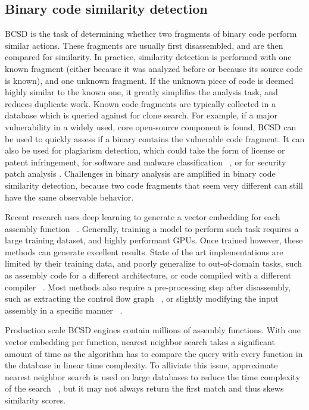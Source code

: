 \subsection{Binary code similarity detection}

BCSD is the task of determining whether two fragments of binary code perform similar actions.
These fragments are usually first disassembled, and are then compared for similarity. In practice,
similarity detection is performed with one known fragment (either because it was analyzed before
or because its source code is known), and one unknown fragment. If the unknown piece of code is deemed
highly similar to the known one, it greatly simplifies the analysis task, and reduces duplicate work. Known
code fragments are typically collected in a database which is queried against for clone search. For example,
if a major vulnerability in a widely used, core open-source component is found, BCSD can be used to quickly
assess if a binary contains the vulnerable code fragment. It can also be used for plagiarism detection, which
could take the form of license or patent infringement, for software and malware classification ~\cite{op-seq}, or for 
security patch analysis \cite{patch}. Challenges in binary analysis are amplified in binary code similarity detection,
because two code fragments that seem very different can still have the same observable behavior.

Recent research uses deep learning to generate a vector embedding for each assembly function ~\cite{SAFE,PalmTree,OrderMatters,Asm2Vec,CLAP}.
Generally, training a model to perform such task requires a large training dataset, and highly performant GPUs.
Once trained however, these methods can generate excellent results.
State of the art implementations are limited by their training data, and poorly generalize to out-of-domain tasks,
such as assembly code for a different architecture, or code compiled with a different compiler ~\cite{BCSDsurvey,CLAP}.
Most methods also require a pre-processing step after disassembly, such as extracting the control flow graph
~\cite{OrderMatters,Asm2Vec}, or slightly modifying the input assembly in a specific manner ~\cite{PalmTree,CLAP}.

Production scale BCSD engines contain millions of assembly functions. With one vector embedding per function, nearest neighbor
search takes a significant amount of time as the algorithm has to compare the query with every function in the database in linear
time complexity. To alliviate this issue, approximate nearest neighbor search is used on large databases to reduce the time
complexity of the search ~\cite{ANN,ANN-limits}, but it may not always return the first match and thus skews similarity scores.

